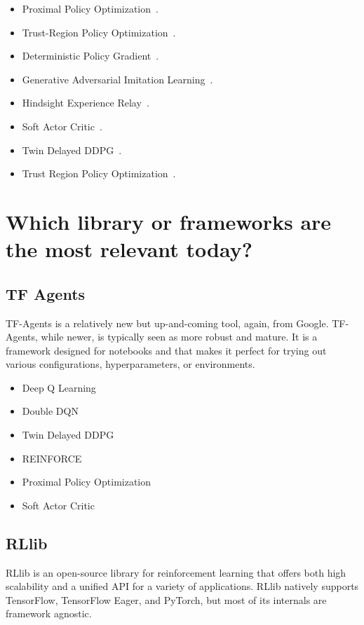 \documentclass[letterpaper, 10 pt]{IEEEconf}
\begin{document}
\begin{itemize}
\item Proximal Policy Optimization~\cite{schulman2017proximal}.
  \item Trust-Region Policy Optimization~\cite{schulman2015trust}.
  \item Deterministic Policy Gradient~\cite{silver2014deterministic}.
  \item Generative Adversarial Imitation Learning~\cite{ho2016generative}.
  \item Hindsight Experience Relay~\cite{AndrychowiczWRS17}.
  \item Soft Actor Critic~\cite{abs-1801-01290}.
  \item Twin Delayed DDPG~\cite{dankwa2019twin}.
  \item Trust Region Policy Optimization~\cite{schulman2015trust}.
\end{itemize}


\section{Which library or frameworks are the most relevant today?}

\subsection{TF Agents~\cite{TFAgents}}

TF-Agents is a relatively new but up-and-coming tool, again, from
Google.  TF-Agents, while newer, is typically seen as more robust and
mature. It is a framework designed for notebooks and that makes it
perfect for trying out various configurations, hyperparameters, or
environments.

\begin{itemize}
	\item Deep Q Learning
	\item Double DQN
	\item Twin Delayed DDPG
	\item REINFORCE
	\item Proximal Policy Optimization
	\item Soft Actor Critic
\end{itemize}

\subsection{RLlib~\cite{liang2018rllib}}

RLlib is an open-source library for reinforcement learning that offers
both high scalability and a unified API for a variety of
applications. RLlib natively supports TensorFlow, TensorFlow Eager,
and PyTorch, but most of its internals are framework agnostic.
\end{document}
